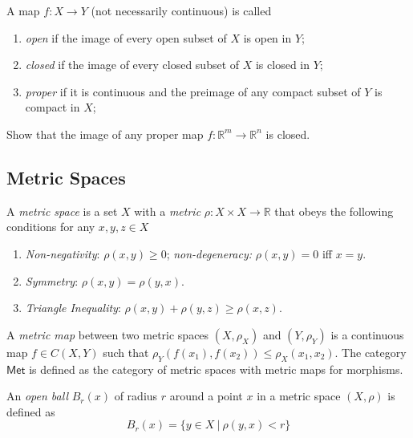 \documentclass[english,letterpaper]{article}%
\numberwithin{equation}{section}
\numberwithin{figure}{section}
\numberwithin{table}{section}
\theoremstyle{definition}
\theoremstyle{definition}
\theoremstyle{definition}
\theoremstyle{plain}
\theoremstyle{plain}
\theoremstyle{plain}
\theoremstyle{plain}
\theoremstyle{remark}
\theoremstyle{remark}
\renewcommand{\leq}{\leqslant}
\begin{document}
\begin{defn}
A map $f:X\to Y$ (not necessarily continuous) is called
\begin{enumerate}
    \item \emph{open} if the image of every open subset of $X$ is open in $Y$;
    \item \emph{closed} if the image of every closed subset of $X$ is closed in $Y$;
    \item \emph{proper} if it is continuous and the preimage of any compact subset of $Y$ is compact in $X$;
\end{enumerate}
\end{defn}

\begin{xca}
Show that the image of any proper map $f:\mathbb{R}^m\to\mathbb{R}^n$ is closed.
\end{xca}

\subsection{Metric Spaces}

\begin{defn}
A \emph{metric space} is a set $X$ with a \emph{metric} $\rho:X\times X\rightarrow \mathbb{R}$ that obeys the following conditions for any $x,y,z\in X$
\begin{enumerate}
    \item \emph{Non-negativity}: $\rho(x,y)\ge 0$; \emph{non-degeneracy:} $\rho(x,y)=0$ iff $x=y$.
    \item \emph{Symmetry}: $\rho(x,y) = \rho(y,x)$.
    \item \emph{Triangle Inequality}: $\rho(x,y) + \rho(y,z) \ge \rho(x,z)$.
\end{enumerate}
\end{defn}

\begin{defn}
A \emph{metric map} between two metric spaces $(X,\rho_X)$ and $(Y,\rho_Y)$ is a continuous map $f\in C(X,Y)$ such that $\rho_Y (f(x_1),f(x_2))\leq \rho_X (x_1,x_2)$. The category $\mathsf{Met}$ is defined as the category of metric spaces with metric maps for morphisms.
\end{defn}

\begin{defn}
An \emph{open ball} $B_r(x)$ of radius $r$ around a point $x$ in a metric space $(X,\rho)$ is defined as
\begin{equation}
    B_r(x) = \{ y\in X ~|~ \rho(y,x)< r \}
\end{equation}
\end{defn}
\end{document}
